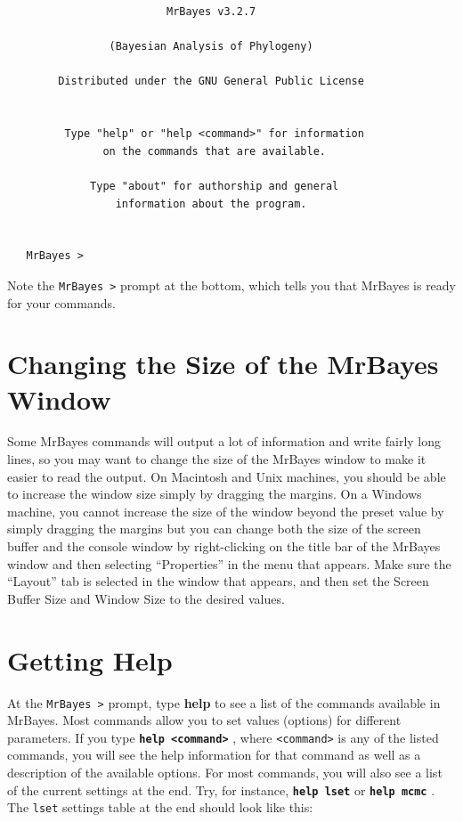 \documentclass[12pt]{book}
\newcommand{\ttt}[1]{\texttt{#1} }
\newcommand{\tb}[1]{\ttt{\textbf{#1}} }
\begin{document}
\begin{singlespacing}
\small
\begin{verbatim}
                         MrBayes v3.2.7

                (Bayesian Analysis of Phylogeny)

        Distributed under the GNU General Public License


         Type "help" or "help <command>" for information
               on the commands that are available.

             Type "about" for authorship and general
                 information about the program.


   MrBayes >
\end{verbatim}
\normalsize
\end{singlespacing}

Note the \ttt{MrBayes >} prompt at the bottom, which tells you that MrBayes is ready for your
commands.

\section{Changing the Size of the MrBayes Window}

Some MrBayes commands will output a lot of information and write fairly long lines, so you may want
to change the size of the MrBayes window to make it easier to read the output. On Macintosh and
Unix machines, you should be able to increase the window size simply by dragging the margins. On a
Windows machine, you cannot increase the size of the window beyond the preset value by simply
dragging the margins but you can change both the size of the screen buffer and the console window
by right-clicking on the title bar of the MrBayes window and then selecting ``Properties'' in the
menu that appears. Make sure the ``Layout'' tab is selected in the window that appears, and then
set the Screen Buffer Size and Window Size to the desired values.

\section{Getting Help}
\label{gettingHelp}

At the \ttt{MrBayes >} prompt, type \textbf{help} to see a list of the commands available in MrBayes.
Most commands allow you to set values (options) for different parameters. If you type \tb{help
<command>}, where \ttt{<command>} is any of the listed commands, you will see the help information
for that command as well as a description of the available options. For most commands, you will
also see a list of the current settings at the end.  Try, for instance, \tb{help lset} or \tb{help
mcmc}. The \ttt{lset} settings table at the end should look like this:
\end{document}
